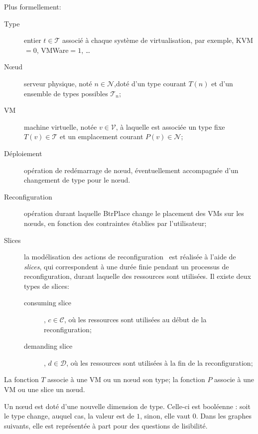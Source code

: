 \documentclass[a4paper]{article}
\begin{document}
Plus formellement:
\begin{description}
	\item[Type] entier $t \in \mathcal T$ associé à chaque système de virtualisation,
		par exemple, KVM$=0$, VMWare$=1$, \ldots
	\item[Nœud] serveur physique, noté $n \in \mathcal N$,doté d'un
		type courant $T(n)$ et d'un ensemble de types possibles
		$\mathcal{T}_n$;
	\item[VM] machine virtuelle, notée $v \in \mathcal V$, à laquelle
		est associée un type fixe $T(v) \in \mathcal T$ et un emplacement courant $P(v) \in \mathcal N$;
	\item[Déploiement] opération de redémarrage de nœud, éventuellement
		accompagnée d'un changement de type pour le nœud.
	\item[Reconfiguration] opération durant laquelle BtrPlace change le
		placement des VMs sur les nœuds, en fonction des contraintes
		établies par l'utilisateur;
	\item[Slices] la modélisation des actions de reconfiguration~\cite{herm2012}
		est réalisée à l'aide de \textit{slices}, qui correspondent à
		une durée finie pendant un processus de reconfiguration, durant laquelle
		des ressources sont utilisées. Il existe deux types de slices:
	\begin{description}
		\item[consuming slice], $c \in \mathcal C$, où les ressources sont
			utilisées au début de la reconfiguration;
		\item[demanding slice], $d \in \mathcal D$, où les ressources sont
		utilisées à la fin de la reconfiguration;
	\end{description}
\end{description}

La fonction $T$ associe à une VM ou un nœud son type; la fonction $P$
associe à une VM ou une slice un nœud.

Un nœud est doté d'une nouvelle dimension de type. Celle-ci
est booléenne : soit le type change, auquel cas, la valeur est de $1$,
sinon, elle vaut $0$. Dans les graphes suivants, elle est représentée
à part pour des questions de lisibilité.
\end{document}
